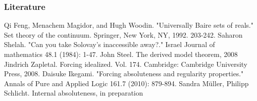 \documentclass[handout, dvipsnames, usenames, 9pt, serif]{beamer}
\begin{document}
\begin{frame}
\frametitle{Literature} 

\begin{thebibliography}{1}
Qi Feng, Menachem Magidor, and Hugh Woodin. "Universally Baire sets of reals." Set theory of the continuum. Springer, New York, NY, 1992. 203-242.
Saharon Shelah. "Can you take Solovay's inaccessible away?." Israel Journal of mathematics 48.1 (1984): 1-47.
John Steel. The derived model theorem, 2008 
Jindrich Zapletal. Forcing idealized. Vol. 174. Cambridge: Cambridge University Press, 2008.
Daisuke Ikegami. "Forcing absoluteness and regularity properties." Annals of Pure and Applied Logic 161.7 (2010): 879-894.
Sandra M\"uller, Philipp Schlicht. Internal absoluteness, in preparation 
\end{thebibliography} 

\end{frame}



\begin{frame}


\end{frame}
\end{document}
